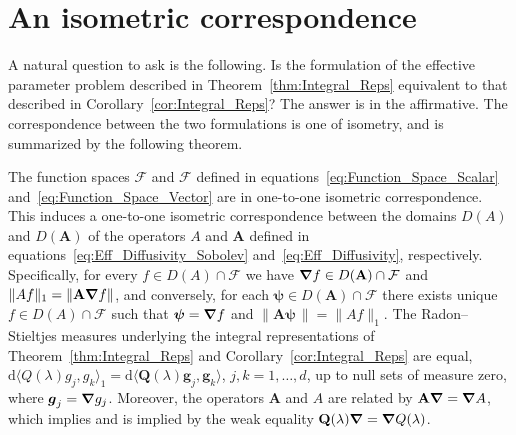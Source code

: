 \documentclass[leqno,onefignum,onetabnum]{siamltex1213}
\newcommand{\thmref}[1]{Theorem~\ref{#1}}
\newcommand{\corref}[1]{Corollary~\ref{#1}}
\renewcommand{\d}{\mathrm{d}}
\newcommand{\Ab}{\mathbf{A}}
\newcommand{\Qb}{\mathbf{Q}}
\newcommand{\Fc}{\mathcal{F}}
\newcommand{\Fs}{\mathscr{F}}
\newcommand\bnabla{\mbox{\boldmath${\nabla}$}}
\newcommand{\vecg}{\boldsymbol{g}}
\newcommand{\vecpsi}{\boldsymbol{\psi}}
\begin{document}
\section{An isometric
  correspondence} \label{sec:Isometric_Correspondence} 
%
A natural question to ask is the following. Is the formulation of the
effective parameter problem described in \thmref{thm:Integral_Reps}
equivalent to that described in \corref{cor:Integral_Reps}? The answer
is in the affirmative. The correspondence between the two formulations
is one of isometry, and is summarized by the following theorem.  
%
\begin{theorem}\label{thm:Formulation_Equivalence}
%  
The function spaces $\Fs$ and $\Fc$ defined in
equations~\eqref{eq:Function_Space_Scalar}
and~\eqref{eq:Function_Space_Vector} are in one-to-one isometric
correspondence. This induces a one-to-one 
isometric correspondence between the domains $D(A)$ and $D(\Ab)$ of
the operators $A$ and $\Ab$ defined in
equations~\eqref{eq:Eff_Diffusivity_Sobolev}
and~\eqref{eq:Eff_Diffusivity}, 
respectively. Specifically, for every $f\in D(A)\cap\Fs$ we have
$\bnabla f\in D(\Ab)\cap\Fc$ and $\|Af\|_1=\|\Ab\bnabla f\|$, and conversely,
for each $\vecpsi\in D(\Ab)\cap\Fc$ there exists unique $f\in D(A)\cap\Fs$ such that
$\vecpsi=\bnabla f$  and $\|\Ab\vecpsi\,\|=\|Af\|_1$. The Radon--Stieltjes
measures underlying the integral representations of \thmref{thm:Integral_Reps}
and \corref{cor:Integral_Reps} are equal, $\d\langle
Q(\lambda)g_j,g_k\rangle_1=\d\langle\Qb(\lambda)\vecg_j,\vecg_k\rangle$, $j,k=1,\ldots,d$, up to null
sets of measure zero, where $\vecg_j=\bnabla g_j$. Moreover, the
operators $\Ab$ and $A$ are related by $\Ab\bnabla =\bnabla A$, which
implies and is implied by the weak equality $\Qb(\lambda)\bnabla =\bnabla
Q(\lambda)$. 
%
\end{theorem}
%
\end{document}
